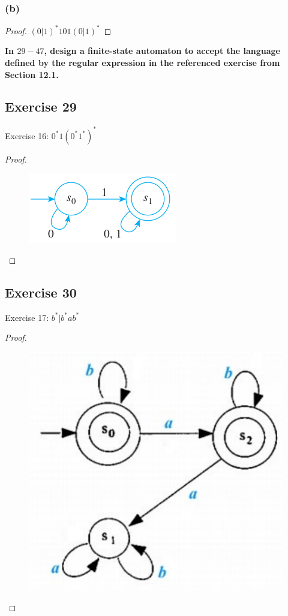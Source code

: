 \documentclass[14pt]{extarticle}
\newcommand{\cy}{\color{cyan}}
\begin{document}
\subsubsection{(b)}
\begin{proof}
\((0|1)^*101(0|1)^*\)
\end{proof}

{\bf \cy In \(29-47\), design a finite-state automaton to accept the language defined by the regular expression in the 
referenced exercise from Section 12.1.}

\subsection{Exercise 29}
Exercise 16: \(0^*1(0^*1^*)^*\)
\begin{proof}
\begin{figure}[ht!]
\centering
\includegraphics[scale=0.5]{../images/12.2.29.png}
\end{figure}
\end{proof}

\subsection{Exercise 30}
Exercise 17: \(b^* | b^*ab^*\)
\begin{proof}
\begin{figure}[ht!]
\centering
\includegraphics[scale=0.3]{../images/12.2.30.png}
\end{figure}
\end{proof}
\end{document}
